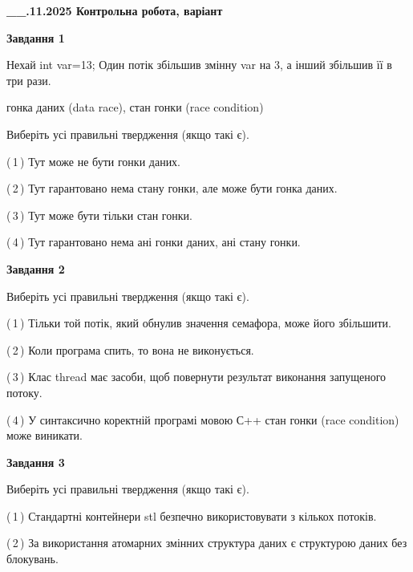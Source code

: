 \documentclass[12pt, ukrainian]{article}
\begin{document}
\begin {large}

\textbf{\_\_.11.2025 Контрольна робота, варіант  }\par


{

\begin{center}
\textbf{Завдання 1}
\end{center}
Нехай int var=13; Один потік збільшив змінну var на 3, а інший збільшив її в три рази.

гонка даних (data race), стан гонки (race condition)

Виберіть усі правильні твердження (якщо такі є).\par
\vspace{2mm}
(\,1\,) Тут може не бути гонки даних.%

(\,2\,) Тут гарантовано нема стану гонки, але може бути гонка даних.%

(\,3\,) Тут може бути тільки стан гонки.%

(\,4\,) Тут гарантовано нема ані гонки даних, ані стану гонки.%



\begin{center}
\textbf{Завдання 2}
\end{center}
Виберіть усі правильні твердження (якщо такі є).\par
\vspace{2mm}

(\,1\,) Тільки той потік, який обнулив значення семафора, може його збільшити.%

(\,2\,) Коли програма спить, то вона не виконується.%

(\,3\,) Клас thread має засоби, щоб повернути результат виконання запущеного потоку.%

(\,4\,) У синтаксично коректній програмі мовою С++ стан гонки (race condition) може виникати.%



\begin{center}
\textbf{Завдання 3}
\end{center}
Виберіть усі правильні твердження (якщо такі є).\par
\vspace{2mm}

(\,1\,) Стандартні контейнери stl безпечно використовувати з кількох потоків.%

(\,2\,) За використання атомарних змінних структура даних є структурою даних без блокувань.%

}
\end{large}
\end{document}
